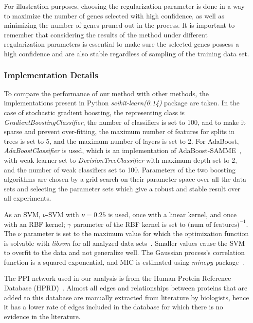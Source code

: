 For illustration purposes, choosing the regularization parameter is done in a way to maximize the number of genes selected with high confidence, as well as minimizing the number of genes pruned out in the process. It is important to remember that considering the results of the method under different regularization parameters is essential to make sure the selected genes possess a high confidence and are also stable regardless of sampling of the training data set.
\subsubsection{Implementation Details}
To compare the performance of our method with other methods, the implementations present in Python \emph{scikit-learn(0.14)} package are taken. In the case of stochastic gradient boosting, the representing class is \emph{GradientBoostingClassifier}, the number of classifiers is set to 100, and to make it sparse and prevent over-fitting, the maximum number of features for splits in trees is set to 5, and the maximum number of layers is set to 2.
For AdaBoost, \emph{AdaBoostClassifier} is used, which is an implementation of AdaBoost-SAMME~\cite{zhu2009multi}, with weak learner set to \emph{DecisionTreeClassifier} with maximum depth set to 2, and the number of weak classifiers set to 100. Parameters of the two boosting algorithms are chosen by a grid search on their parameter space over all the data sets and selecting the parameter sets which give a robust and stable result over all experiments.

As an SVM, $\nu$-SVM with $\nu = 0.25$ is used, once with a linear kernel, and once with an RBF kernel; $\gamma$ parameter of the RBF kernel is set to $\textrm{(num of features)}^{-1}$. The $\nu$ parameter is set to the maximum value for which the optimization function is solvable with \emph{libsvm} for all analyzed data sets~\cite{CC01a}. Smaller values cause the SVM to overfit to the data and not generalize well.
The Gaussian process's correlation function is a squared-exponential, and MIC is estimated using \emph{minepy} package~\cite{albanese2013minerva}.

The PPI network used in our analysis is from the Human Protein Reference Database (HPRD)~\cite{peri2003development}. Almost all edges and relationships between proteins that are added to this database are manually extracted from literature by biologists, hence it has a lower rate of edges included in the database for which there is no evidence in the literature.


